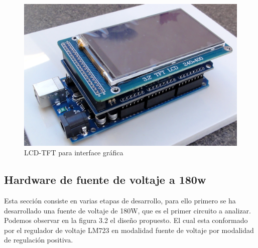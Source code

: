\begin{figure}[H]
\centering
\includegraphics[width=9
cm]{Capitulo3/figs/pantalla0.jpg}
\caption{LCD-TFT para interface gráfica}
\end{figure}
\subsection{Hardware de fuente de voltaje a 180w}

Esta sección consiste en varias etapas de desarrollo, para ello primero se ha desarrollado una fuente de voltaje de 180W, que es el primer circuito a analizar. Podemos observar en la figura 3.2 el diseño propuesto. El cual esta conformado por el regulador de voltaje LM723 en modalidad fuente de voltaje por modalidad de regulación positiva.\\

